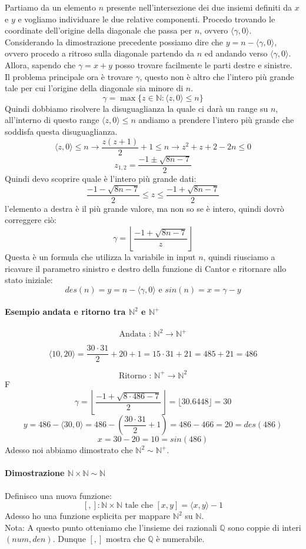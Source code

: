 \documentclass{article}
\begin{document}
Partiamo da un elemento $n$ presente nell'intersezione dei due insiemi definiti da
$x$ e $y$ e vogliamo individuare le due relative componenti. Procedo trovando
le coordinate dell'origine della diagonale che passa per $n$, ovvero $\langle\gamma ,0\rangle$.
Considerando la dimostrazione precedente possiamo dire che $y = n-\langle\gamma ,0\rangle$, ovvero
procedo a ritroso sulla diagonale partendo da $n$ ed andando verso $\langle\gamma ,0\rangle$.\\Allora,
sapendo che $\gamma=x+y$ posso trovare facilmente le parti destre e sinistre.\\ Il problema principale
ora è trovare $\gamma$, questo non è altro che l'intero più grande tale per cui l'origine
della diagonale sia minore di $n$.
$$\gamma = \max\{z\in\mathbb{N}:\langle z,0\rangle\leq n\}$$
Quindi dobbiamo risolvere la disuguaglianza la quale ci darà un range su $n$, all'interno di questo
range $\langle z,0\rangle\leq n$ andiamo a prendere l'intero più grande che soddisfa questa disuguaglianza.
$$\langle z,0\rangle\leq n\longrightarrow\frac{z(z+1)}{2}+1\leq n\longrightarrow z^2+z+2-2n\leq 0$$
$$z_{1,2}=\frac{-1 \pm\sqrt{8n-7}}{2}$$
Quindi devo scoprire quale è l'intero più grande dati:
$$\frac{-1 -\sqrt{8n-7}}{2}\leq z\leq \frac{-1 +\sqrt{8n-7}}{2} $$
l'elemento a destra è il più grande valore, ma non so se è intero, quindi dovrò correggere ciò:
$$\gamma=\left\lfloor\frac{-1+\sqrt{8n-7}}{z} \right\rfloor$$
Questa è un formula che utilizza la variabile in input $n$, quindi riusciamo a ricavare il parametro
sinistro e destro della funzione di Cantor e ritornare allo stato iniziale:
$$des(n)=y=n-\langle\gamma ,0\rangle \text{ e }sin(n)=x=\gamma -y$$

\paragraph{Esempio andata e ritorno tra $\mathbb{N}^2$ e $\mathbb{N}^+$}
$$\text{Andata : }\mathbb{N}^2 \longrightarrow\mathbb{N}^+$$

$$\langle 10,20\rangle = \frac{30\cdot31}{2}+20+1=15\cdot31+21=485+21=486$$

$$\text{Ritorno : }\mathbb{N}^+\longrightarrow\mathbb{N}^2$$F
$$\gamma = \left\lfloor \frac{-1 + \sqrt{8 \cdot 486-7}}{2} \right\rfloor = \lfloor 30.6448\rfloor = 30$$
$$y=486- \langle 30,0\rangle = 486- \left(\frac{30\cdot31}{2}+1\right)=486-466=20=des(486)$$
$$x=30-20=10=sin(486)$$
Adesso noi abbiamo dimostrato che $\mathbb{N}^2\sim\mathbb{N}^+$.

\paragraph{Dimostrazione $\mathbb{N}\times\mathbb{N}\sim\mathbb{N}$}
Definisco una nuova funzione:
$$[,]:\mathbb{N}\times\mathbb{N}\text{ tale che }[x,y]=\langle x,y\rangle-1$$
Adesso ho una funzione esplicita per mappare $\mathbb{N}^2$ su $\mathbb{N}$.\\Nota: A questo
punto otteniamo che l'insieme dei razionali $\mathbb{Q}$ sono coppie di interi $(num,den)$. Dunque
$[,]$ mostra che $\mathbb{Q}$ è numerabile.
\end{document}
